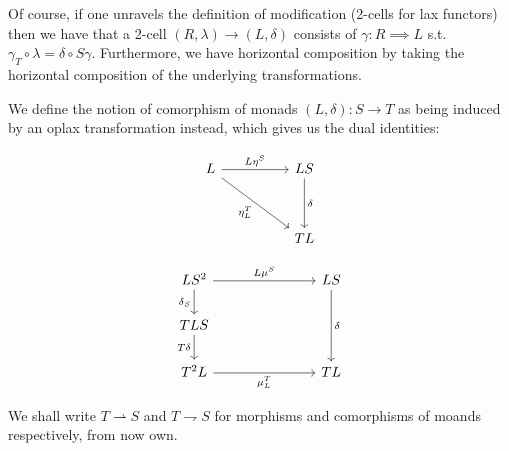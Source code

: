 \documentclass[10pt, oneside]{article}
\begin{document}
Of course, if one unravels the definition of modification (2-cells for lax functors) then we have that a 2-cell $(R, \lambda) \to (L, \delta)$ consists of $\gamma: R \implies L$ s.t. $\gamma_T \circ \lambda = \delta \circ S \gamma$. Furthermore, we have horizontal composition by taking the horizontal composition of the underlying transformations.

We define the notion of comorphism of monads $(L, \delta): S \to T$ as being induced by an oplax transformation instead, which gives us the dual identities:

\[\begin{tikzcd}[ampersand replacement=\&]
	L \&\& LS \\
	\\
	\&\& TL
	\arrow["{L \eta^S}", from=1-1, to=1-3]
	\arrow["\delta", from=1-3, to=3-3]
	\arrow["{\eta^T_L}"', from=1-1, to=3-3]
\end{tikzcd}\]

\[\begin{tikzcd}[ampersand replacement=\&]
	{LS^2} \&\&\& LS \\
	TLS \\
	{T^2 L} \&\&\& TL
	\arrow["{L \mu^S}", from=1-1, to=1-4]
	\arrow["\delta", from=1-4, to=3-4]
	\arrow["{\delta_S}"', from=1-1, to=2-1]
	\arrow["{T \delta}"', from=2-1, to=3-1]
	\arrow["{\mu^T_L}"', from=3-1, to=3-4]
\end{tikzcd}\]

We shall write $T \rightharpoonup S$ and $T \rightharpoondown S$ for morphisms and comorphisms of moands respectively, from now own.
\end{document}
